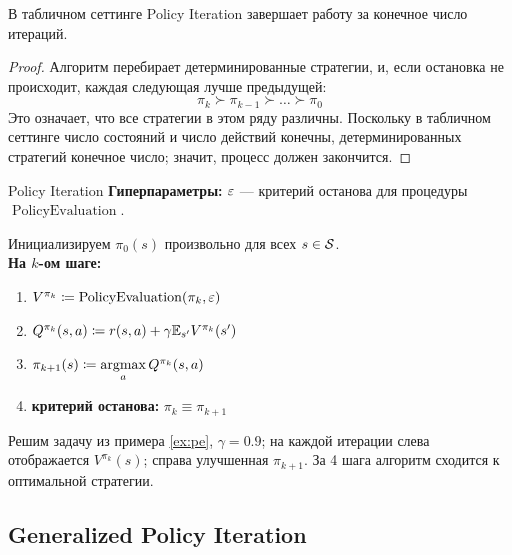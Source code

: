 \begin{theorem}
В табличном сеттинге Policy Iteration завершает работу за конечное число итераций.
\begin{proof}
Алгоритм перебирает детерминированные стратегии, и, если остановка не происходит, каждая следующая лучше предыдущей:
$$\pi_k \succ \pi_{k-1} \succ \dots \succ \pi_0$$
Это означает, что все стратегии в этом ряду различны. Поскольку в табличном сеттинге число состояний и число действий конечны, детерминированных стратегий конечное число; значит, процесс должен закончится.
\end{proof}
\end{theorem}

\begin{algorithm}[label=policyiteration]{Policy Iteration}
\textbf{Гиперпараметры:} $\varepsilon$ --- критерий останова для процедуры $\operatorname{PolicyEvaluation}$.

\vspace{0.3cm}
Инициализируем $\pi_0(s)$ произвольно для всех $s \in \mathcal{S}$. \\
\textbf{На $k$-ом шаге:}
\begin{enumerate}
    \item $V^{\pi_k} \coloneqq \operatorname{PolicyEvaluation}(\pi_k, \varepsilon)$
    \item $Q^{\pi_k}(s, a) \coloneqq r(s, a) + \gamma \mathbb{E}_{s'} V^{\pi_k}(s')$
    \item $\pi_{k+1}(s) \coloneqq \mathop{\mathrm{argmax}}\limits_a Q^{\pi_k}(s, a)$
    \item \textbf{критерий останова:} $\pi_k \equiv \pi_{k+1}$
\end{enumerate}
\end{algorithm}

\begin{exampleBox}[righthand ratio=0.5, sidebyside, sidebyside align=center, lower separated=false]{}
Решим задачу из примера \ref{ex:pe}, $\gamma = 0.9$; на каждой итерации слева отображается $V^{\pi_k}(s)$; справа улучшенная $\pi_{k+1}$. За 4 шага алгоритм сходится к оптимальной стратегии.

\tcblower
\end{exampleBox}

\subsection{Generalized Policy Iteration}

